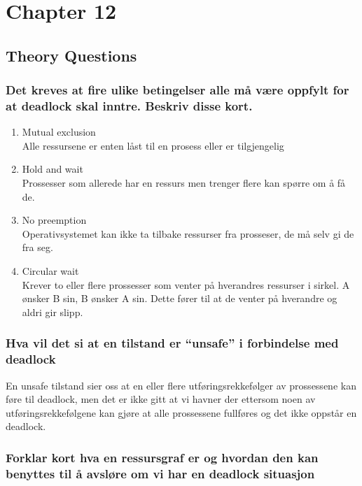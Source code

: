 \documentclass[9pt]{article}
\begin{document}
\section{Chapter 12}
\setcounter{subsection}{2}
\subsection{Theory Questions}
\subsubsection{Det kreves at fire ulike betingelser alle må være oppfylt for at deadlock skal inntre. Beskriv disse kort.}
\begin{enumerate}
\item Mutual exclusion \\ 
Alle ressursene er enten låst til en prosess eller er tilgjengelig
\item Hold and wait \\
Prossesser som allerede har en ressurs men trenger flere kan spørre om å få de.
\item No preemption \\
Operativsystemet kan ikke ta tilbake ressurser fra prosseser, de må selv gi de fra seg.
\item Circular wait \\
Krever to eller flere prossesser som venter på hverandres ressurser i sirkel. A ønsker B sin, B ønsker A sin. Dette fører til at de venter på hverandre og aldri gir slipp. \\
\end{enumerate}

\subsubsection{Hva vil det si at en tilstand er “unsafe” i forbindelse med deadlock}

En unsafe tilstand sier oss at en eller flere utføringsrekkefølger av prossessene kan føre til deadlock, men det er ikke gitt at vi havner der ettersom noen av utføringsrekkefølgene kan gjøre at alle prossessene fullføres og det ikke oppstår en deadlock.

\subsubsection{Forklar kort hva en ressursgraf er og hvordan den kan benyttes til å avsløre om vi har en deadlock situasjon}
\end{document}
